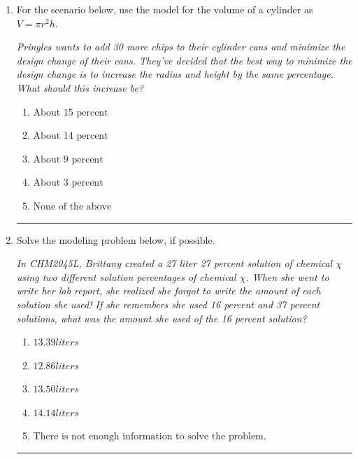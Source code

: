 \documentclass[14pt]{extbook}
\newcommand{\litem}[1]{\item#1\hspace*{-1cm}\rule{\textwidth}{0.4pt}}
\begin{document}
\begin{enumerate}
{\begin{enumerate}[label=\Alph*.]
\end{enumerate} }
\litem{
For the scenario below, use the model for the volume of a cylinder as $V = \pi r^2 h$.
\begin{center}
    \textit{ Pringles wants to add 30 \text{percent} more chips to their cylinder cans and minimize the design change of their cans. They've decided that the best way to minimize the design change is to increase the radius and height by the same percentage. What should this increase be? }
\end{center}
\begin{enumerate}[label=\Alph*.]
\item \( \text{About } 15 \text{ percent} \)
\item \( \text{About } 14 \text{ percent} \)
\item \( \text{About } 9 \text{ percent} \)
\item \( \text{About } 3 \text{ percent} \)
\item \( \text{None of the above} \)

\end{enumerate} }
\litem{
Solve the modeling problem below, if possible.
\begin{center}
    \textit{ In CHM2045L, Brittany created a 27 liter 27 percent solution of chemical $\chi$ using two different solution percentages of chemical $\chi$. When she went to write her lab report, she realized she forgot to write the amount of each solution she used! If she remembers she used 16 percent and 37 percent solutions, what was the amount she used of the 16 percent solution? }
\end{center}
\begin{enumerate}[label=\Alph*.]
\item \( 13.39 liters \)
\item \( 12.86 liters \)
\item \( 13.50 liters \)
\item \( 14.14 liters \)
\item \( \text{There is not enough information to solve the problem.} \)


\end{enumerate}}
\end{enumerate}
\end{document}
